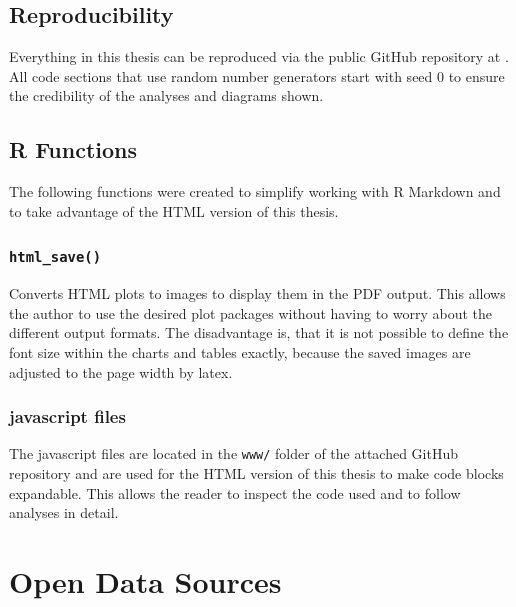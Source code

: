 \documentclass[
  oneside, a4paper, 12pt, openany]{book}
\theoremstyle{definition}
\theoremstyle{definition}
\theoremstyle{definition}
\theoremstyle{definition}
\theoremstyle{remark}
\begin{document}
\normalsize\vspace{0.1cm}

\hypertarget{reproducibility}{%
\section{Reproducibility}\label{reproducibility}}

Everything in this thesis can be reproduced via the public GitHub repository at \citep{GitHub}. All code sections that use random number generators start with seed 0 to ensure the credibility of the analyses and diagrams shown.

\hypertarget{r-functions}{%
\section{R Functions}\label{r-functions}}

The following functions were created to simplify working with R Markdown and to take advantage of the HTML version of this thesis.

\hypertarget{html_save}{%
\subsection{\texorpdfstring{\texttt{html\_save()}}{html\_save()}}\label{html_save}}

Converts HTML plots to images to display them in the PDF output. This allows the author to use the desired plot packages without having to worry about the different output formats. The disadvantage is, that it is not possible to define the font size within the charts and tables exactly, because the saved images are adjusted to the page width by latex.

\hypertarget{javascript-files}{%
\subsection{javascript files}\label{javascript-files}}

The javascript files are located in the \texttt{www/} folder of the attached GitHub repository and are used for the HTML version of this thesis to make code blocks expandable. This allows the reader to inspect the code used and to follow analyses in detail.

\hypertarget{open-data-sources}{%
\chapter{Open Data Sources}\label{open-data-sources}}
\end{document}
